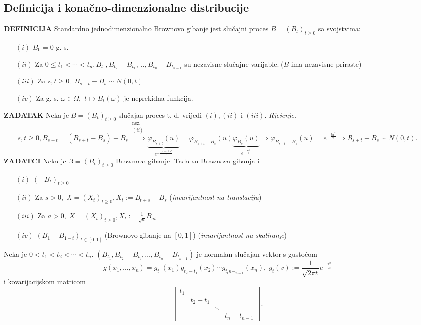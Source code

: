 \documentclass{article}
\begin{document}
\subsection{Definicija i konačno-dimenzionalne distribucije}
\textbf{DEFINICIJA}\newline
Standardno jednodimenzionalno Brownovo gibanje jest slučajni proces \(B=(B_t)_{t\ge0}\) sa svojstvima:
\begin{enumerate}
    \item[\((i)\)] \(B_0=0\) g. s.
    \item[\((ii)\)] Za \(0\le t_1<\cdots<t_n,B_{t_1},B_{t_2}-B_{t_1},\ldots,B_{t_n}-B_{t_{n-1}}\) su nezavisne slučajne varijable. (\(B\) ima nezavisne priraste)
    \item[\((iii)\)] Za \(s,t\ge0,\) \(B_{s+t}-B_s\sim N(0,t)\)
    \item[\((iv)\)] Za g. s. \(\omega\in\Omega,\) \(t\mapsto B_t(\omega)\) je neprekidna funkcija.
\end{enumerate}
\textbf{ZADATAK}\newline
Neka je \(B=(B_t)_{t\ge0}\) slučajan proces t. d. vrijedi \((i),(ii)\) i \((iii).\)\newline\newline
\textit{Rješenje.} \[s,t\ge0, B_{s+t}=(B_{s+t}-B_s)+B_s\overset{\substack{\text{nez.}\\(ii)}}{\Rightarrow}\underbrace{\varphi_{B_{s+t}}(u)}_{e^{-\frac{(s+t)u^2}2}}=\varphi_{B_{s+t}-B_s}(u)\underbrace{\varphi_{B_s}(u)}_{e^{-\frac{su^2}2}}\Rightarrow\varphi_{B_{s+t}-B_s}(u)=e^{-\frac{tu^2}2}\Rightarrow B_{s+t}-B_s\sim N(0,t).\]
\textbf{ZADATCI}\newline
Neka je \(B=(B_t)_{t\ge0}\) Brownovo gibanje. Tada su Brownova gibanja i 
\begin{enumerate}
    \item[\((i)\)] \((-B_t)_{t\ge0}\)
    \item[\((ii)\)] Za \(s>0,\) \(X=(X_t)_{t\ge0},X_t:=B_{t+s}-B_s\) (\emph{invarijantnost na translaciju})
    \item[\((iii)\)] Za \(a>0,\) \(X=(X_t)_{t\ge0}, X_t:=\frac1{\sqrt a}B_{at}\)
    \item[\((iv)\)] \((B_1-B_{1-t})_{t\in[0,1]}\) (Brownovo gibanje na \([0,1]\)) (\emph{invarijantnost na skaliranje})
\end{enumerate}
Neka je \(0<t_1<t_2<\cdots<t_n.\) \(\left(B_{t_1},B_{t_2}-B_{t_1},\ldots,B_{t_n}-B_{t_{n-1}}\right)\) je normalan slučajan vektor s gustoćom \[g(x_1,\ldots,x_n)=g_{t_1}(x_1)g_{t_2-t_1}(x_2)\cdots g_{t_tn-_{n-1}}(x_n),\;g_t(x):=\frac1{\sqrt{2\pi t}}e^{-\frac{x^2}{2t}}\] i kovarijacijskom matricom \[\begin{bmatrix}t_1&&&\\&t_2-t_1&&\\&&\ddots&\\&&&t_n-t_{n-1}\end{bmatrix}.\]
\end{document}
